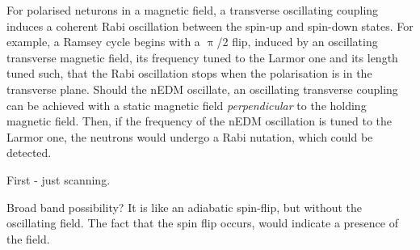 For polarised neturons in a magnetic field, a transverse oscillating coupling induces a coherent Rabi oscillation between the spin-up and spin-down states.
For example, a Ramsey cycle begins with a $\uppi$/2 flip, induced by an oscillating transverse magnetic field, its frequency tuned to the Larmor one and its length tuned such, that the Rabi oscillation stops when the polarisation is in the transverse plane. Should the nEDM oscillate, an oscillating transverse coupling can be achieved with a static magnetic field \emph{perpendicular} to the holding magnetic field. Then, if the frequency of the nEDM oscillation is tuned to the Larmor one, the neutrons would undergo a Rabi nutation, which could be detected.



First - just scanning.

Broad band possibility? It is like an adiabatic spin-flip, but without the oscillating field. The fact that the spin flip occurs, would indicate a presence of the field.